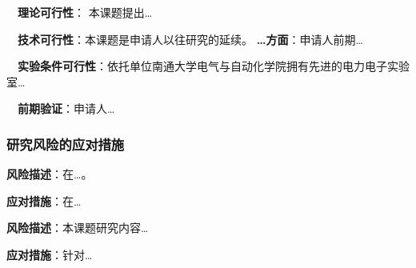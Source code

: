 ~~\textbf{理论可行性}：
本课题提出\dots

~~\textbf{技术可行性}：本课题是申请人以往研究的延续。
\textbf{\dots 方面}：申请人前期\dots

~~\textbf{实验条件可行性}：依托单位南通大学电气与自动化学院拥有先进的电力电子实验室\dots

~~\textbf{前期验证}：申请人\dots

\subsubsection{研究风险的应对措施}


\textbf{风险描述}：在\dots。

\textbf{应对措施}：在\dots


\textbf{风险描述}：本课题研究内容\dots

\textbf{应对措施}：针对\dots
